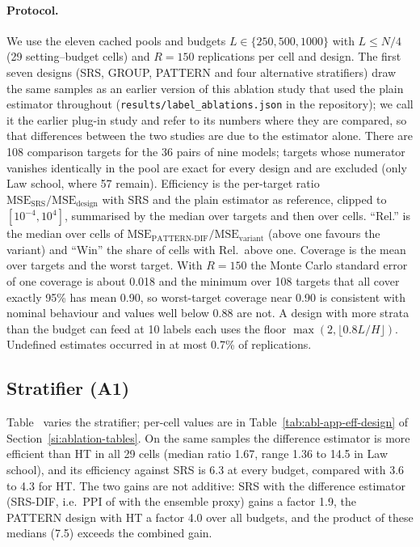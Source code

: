 \paragraph{Protocol.} We use the eleven cached pools and budgets $L\in\{250,500,1000\}$ with $L\le N/4$ (29 setting--budget cells) and $R=150$ replications per cell and design. The first seven designs (SRS, GROUP, PATTERN and four alternative stratifiers) draw the same samples as an earlier version of this ablation study that used the plain estimator throughout (\texttt{results/label\_ablations.json} in the repository); we call it the earlier plug-in study and refer to its numbers where they are compared, so that differences between the two studies are due to the estimator alone. There are 108 comparison targets for the 36 pairs of nine models; targets whose numerator vanishes identically in the pool are exact for every design and are excluded (only Law school, where 57 remain). Efficiency is the per-target ratio $\mathrm{MSE}_{\mathrm{SRS}}/\mathrm{MSE}_{\mathrm{design}}$ with SRS and the plain estimator as reference, clipped to $[10^{-4},10^{4}]$, summarised by the median over targets and then over cells. ``Rel.'' is the median over cells of $\mathrm{MSE}_{\mathrm{PATTERN\text{-}DIF}}/\mathrm{MSE}_{\mathrm{variant}}$ (above one favours the variant) and ``Win'' the share of cells with Rel.\ above one. Coverage is the mean over targets and the worst target. With $R=150$ the Monte Carlo standard error of one coverage is about 0.018 and the minimum over 108 targets that all cover exactly 95\% has mean 0.90, so worst-target coverage near 0.90 is consistent with nominal behaviour and values well below 0.88 are not. A design with more strata than the budget can feed at 10 labels each uses the floor $\max(2,\lfloor 0.8L/H\rfloor)$. Undefined estimates occurred in at most 0.7\% of replications.

\subsection{Stratifier (A1)}

Table~ varies the stratifier; per-cell values are in Table~\ref{tab:abl-app-eff-design} of Section~\ref{si:ablation-tables}. On the same samples the difference estimator is more efficient than HT in all 29 cells (median ratio 1.67, range 1.36 to 14.5 in Law school), and its efficiency against SRS is 6.3 at every budget, compared with 3.6 to 4.3 for HT. The two gains are not additive: SRS with the difference estimator (SRS-DIF, i.e.\ PPI of \citealt{angelopoulos2023ppi} with the ensemble proxy) gains a factor 1.9, the PATTERN design with HT a factor 4.0 over all budgets, and the product of these medians (7.5) exceeds the combined gain.

